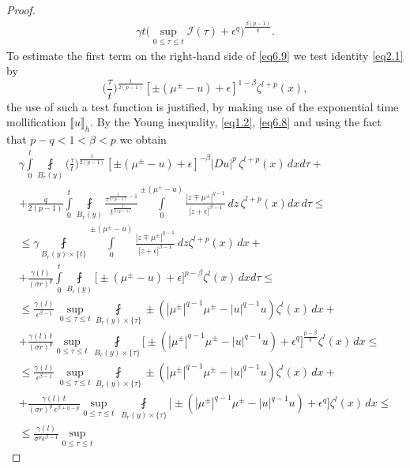 \documentclass[10pt,a4paper]{amsart}
\begin{document}
\begin{proof}
\begin{multline}
\gamma t\Big(\sup\limits_{0\leqslant \tau\leqslant t}\mathcal{I}(\tau)+\epsilon^q\Big)^{\frac{\beta (p-1)}{q}}.
\end{multline}
To estimate the first term on the right-hand side of \eqref{eq6.9} we test identity \eqref{eq2.1} by $$\Big(\frac{\tau}{t}\Big)^{\frac{1}{2(p-1)}}[\pm(\mu^{\pm}-u)+\epsilon]^{1-\beta}\zeta^{l+p}(x),$$ 
the use of such a test function is justified,  by making use of the
exponential time mollification  $\llbracket u \rrbracket_h$.
By the Young inequality, \eqref{eq1.2}, \eqref{eq6.8} and using the fact that $p-q< 1< \beta <p$ we obtain
\begin{multline}\label{eq6.11}
\gamma\int\limits^t_0\fint\limits_{B_{r}(y)}\Big(\frac{\tau}{t}\Big)^{\frac{1}{2(p-1)}}[\pm(\mu^{\pm}-u)+\epsilon]^{-\beta}|D u|^{p}\,\zeta^{l+p}(x)\,dx d\tau+\\+\frac{q}{2(p-1)}\int\limits^t_0\fint\limits_{B_r(y)}
\frac{\tau^{\frac{1}{2(p-1)}-1}}{t^{\frac{1}{2(p-1)}}}
\int\limits_0^{\pm(\mu^{\pm}-u)}\frac{|z\mp \mu^{\pm}|^{q-1}}{\big[z+\epsilon\big]^{\beta-1}}\,dz\,\zeta^{l+p}(x) dx\,d\tau
\leqslant \\\leqslant \gamma \fint\limits_{B_{ r}(y)\times\{t\}}\int\limits_{0}^{\pm(\mu^{\pm}-u)}\frac{|z\mp\mu^{\pm}|^{q-1}}{\big[z+\epsilon\big]^{\beta-1}}\,dz\zeta^{l+p}(x)\,dx+\\+
\frac{\gamma(l)}{(\sigma r)^p} \int\limits^t_0\fint\limits_{B_{r}(y)}\big[\pm(\mu^{\pm}-u)+\epsilon]^{p-\beta}\zeta^l(x)\,dx d\tau\leqslant \\\leqslant
\frac{\gamma(l)}{\epsilon^{\beta-1}}\,\sup\limits_{0\leqslant \tau\leqslant t}
\fint\limits_{B_{r}(y)\times\{\tau\}}\pm(|\mu^{\pm}|^{q-1}\mu^{\pm}-|u|^{q-1}u)\zeta^l(x)\,dx 
+\\+\frac{\gamma(l)\,t}{(\sigma r)^p}\sup\limits_{0\leqslant \tau\leqslant t}\,\fint\limits_{B_{ r}(y)\times\{\tau\}}\big[\pm(|\mu^{\pm}|^{q-1}\mu^{\pm}-|u|^{q-1}u)+\epsilon^q\big]^{\frac{p-\beta}{q}}\zeta^l(x)
\,dx
\leqslant\\\leqslant
\frac{\gamma(l)}{\epsilon^{\beta-1}}\,\sup\limits_{0\leqslant \tau\leqslant t}
\fint\limits_{B_{r}(y)\times\{\tau\}}\pm(|\mu^{\pm}|^{q-1}\mu^{\pm}-|u|^{q-1}u)\zeta^l(x)\,dx 
+\\+\frac{\gamma(l)\,t}{(\sigma r)^p\,\epsilon^{\beta+q-p}}\sup\limits_{0\leqslant \tau\leqslant t}\,\fint\limits_{B_{ r}(y)\times\{\tau\}}\big[\pm(|\mu^{\pm}|^{q-1}\mu^{\pm}-|u|^{q-1}u)+\epsilon^q\big]\zeta^l(x)
\,dx\leqslant\\\leqslant
\frac{\gamma(l)}{\sigma^p \epsilon^{\beta-1}}\sup\limits_{0\leqslant \tau\leqslant t}

\end{multline}
\end{proof}
\end{document}
